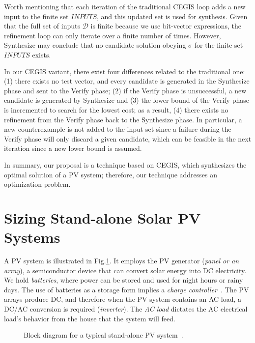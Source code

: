 \documentclass[journal]{IEEEtran}
\begin{document}
Worth mentioning that each iteration of the traditional CEGIS loop adds a new input to the finite set $INPUTS$, and this updated set is used for synthesis. Given that the full set of inputs $\mathcal{D}$ is finite because we use bit-vector expressions, the refinement loop can only iterate over a finite number of times. However, {\sc Synthesize} may conclude that no candidate solution obeying $\sigma$ for the finite set $INPUTS$ exists. 

In our CEGIS variant, there exist four differences related to the traditional one: 
(1) there exists no test vector, and every candidate is generated in the {\sc Synthesize} phase and sent to the {\sc Verify} phase; 
(2) if the {\sc Verify} phase is unsuccessful, a new candidate is generated by {\sc Synthesize} and 
(3) the lower bound of the {\sc Verify} phase is incremented to search for the lowest cost; as a result,
(4) there exists no refinement from the {\sc Verify} phase back to the {\sc Synthesize} phase. In particular, a new counterexample is not added to the {\sc input} set since a failure during the {\sc Verify} phase will only discard a given candidate, which can be feasible in the next iteration since a new lower bound is assumed.

In summary, our proposal is a technique based on CEGIS, which synthesizes the optimal solution of a PV system; therefore, our technique addresses an optimization problem.

\section{Sizing Stand-alone Solar PV Systems}
\label{sec:sizing}
A PV system is illustrated in Fig.\ref{fig:blockdiagram}. It employs the PV generator (\textit{panel or an array}), a semiconductor device that can convert solar energy into DC electricity. We hold \textit{batteries}, where power can be stored and used for night hours or rainy days. The use of batteries as a storage form implies a \textit{charge controller}~\cite{Hansen}. The PV arrays produce DC, and therefore when the PV system contains an AC load, a DC/AC conversion is required (\textit{inverter}). The \textit{AC load} dictates the AC electrical load's behavior from the house that the system will feed.
%
\begin{figure}[ht]
\centering
\caption{Block diagram for a typical stand-alone PV system~\cite{Hansen}.}
\label{fig:blockdiagram} 
\end{figure}
 
\end{document}
